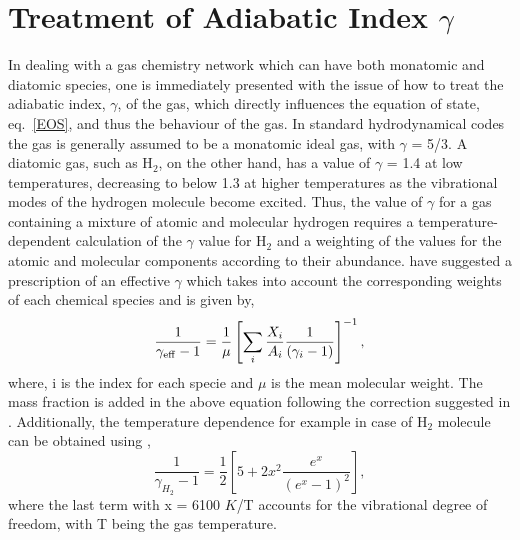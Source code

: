 \documentclass[useAMS,usenatbib]{mn2e}
\begin{document}
\section{Treatment of Adiabatic Index $\gamma$}
\label{sec:treatgamma}
In dealing with a gas chemistry network which can have both monatomic and diatomic
species, one is immediately presented with the issue of how to treat the adiabatic
index, $\gamma$, of the gas, which directly influences the equation of
state, eq.~\ref{EOS}, and thus the behaviour of the gas.
In standard hydrodynamical codes the gas is generally
assumed to be a monatomic ideal gas, with $\gamma$ = 5/3. 
A diatomic gas, such as H$_{2}$, on the other hand, has a value of $\gamma$
= 1.4 at low temperatures, decreasing to below 1.3
at higher temperatures as the vibrational modes of the hydrogen molecule become
excited. Thus, the value of $\gamma$ for a gas containing a mixture of atomic and
molecular hydrogen requires a temperature-dependent calculation of the $\gamma$
value for H$_2$ and a weighting of the values for the atomic and molecular components
according to their abundance. \cite{Yoshida:2006p13376} have suggested
a prescription of an effective $\gamma$ which takes into account the
corresponding weights of each chemical species and is given by,
\begin{equation}
\frac{1}{\gamma_{\rm eff} - 1} = \frac{1}{\mu}\left[\sum_{i}\frac{X_{i}}{A_{i}}\frac{1}{(\gamma_{i} - 1)}\right]^{-1},
\label{eq:gammaeff}
\end{equation}
where, i is the index for each specie and $\mu$ is the mean molecular
weight. The mass fraction is added in the above equation following the
correction suggested in \cite{OSullivan:2009p10078}.
Additionally, the temperature dependence for example in case of
H$_{2}$ molecule can be obtained using \cite{landau:1980},
\begin{equation}
\frac{1}{\gamma_{H_{2}} - 1} = \frac{1}{2}\left[ 5 +
  2x^{2}\frac{e^{x}}{(e^{x} - 1)^{2}}\right],
\label{eq:gammaH2}
\end{equation}
where the last term with  x = 6100 $K$/T accounts for the vibrational
degree of freedom, with T being the gas temperature.
%
\end{document}
